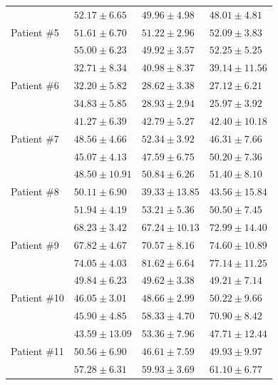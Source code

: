 \documentclass[journal,twoside,web]{ieeecolor}
\begin{document}
\begin{table}[h!]
\begin{tabular}{m{} m{} m{} m{}}
		\hline
		\multirow[t]{3}{*}{Patient \#5}   
		& $52.17 \pm 6.65$ & $49.96 \pm 4.98$ & $48.01 \pm 4.81$ \\ %
        & $51.61 \pm 6.70$ & $51.22 \pm 2.96$ & $52.09 \pm 3.83$ \\
        & $55.00 \pm 6.23$ & $49.92 \pm 3.57$ & $52.25 \pm 5.25$ \\
		\hline
		\multirow[t]{3}{*}{Patient \#6}   
		& $32.71 \pm 8.34$ & $40.98 \pm 8.37$ & $39.14 \pm 11.56$ \\ %
        & $32.20 \pm 5.82$ & $28.62 \pm 3.38$ & $27.12 \pm 6.21$ \\
        & $34.83 \pm 5.85$ & $28.93 \pm 2.94$ & $25.97 \pm 3.92$ \\
		\hline
		\multirow[t]{3}{*}{Patient \#7}   
		& $41.27 \pm 6.39$ & $42.79 \pm 5.27$ & $42.40 \pm 10.18$ \\ %
        & $48.56 \pm 4.66$ & $52.34 \pm 3.92$ & $46.31 \pm 7.66$ \\
        & $45.07 \pm 4.13$ & $47.59 \pm 6.75$ & $50.20 \pm 7.36$ \\
		\hline
		\multirow[t]{3}{*}{Patient \#8}   
		& $48.50 \pm 10.91$ & $50.84 \pm 6.26$ & $51.40 \pm 8.10$ \\ %
        & $50.11 \pm  6.90$ & $39.33 \pm 13.85$ & $43.56 \pm 15.84$ \\
        & $51.94 \pm  4.19$ & $53.21 \pm 5.36$ & $50.50 \pm 7.45$ \\
		\hline
		\multirow[t]{3}{*}{Patient \#9}   
		& $68.23 \pm 3.42$ & $67.24 \pm 10.13$ & $72.99 \pm 14.40$ \\ %
        & $67.82 \pm 4.67$ & $70.57 \pm 8.16$ & $74.60 \pm 10.89$ \\
        & $74.05 \pm 4.03$ & $81.62 \pm 6.64$ & $77.14 \pm 11.25$ \\
        \hline
        \multirow[t]{3}{*}{Patient \#10}
        & $49.84 \pm 6.23$ & $49.62 \pm 3.38$ & $49.21 \pm 7.14$ \\ %
        & $46.05 \pm 3.01$ & $48.66 \pm 2.99$ & $50.22 \pm 9.66$ \\
        & $45.90 \pm 4.85$ & $58.33 \pm 4.70$ & $70.90 \pm 8.42$ \\
        \hline
        \multirow[t]{3}{*}{Patient \#11}
        & $43.59 \pm 13.09$ & $53.36 \pm 7.96$ & $47.71 \pm 12.44$ \\ %
        & $50.56 \pm  6.90$ & $46.61 \pm 7.59$ & $49.93 \pm  9.97$ \\
        & $57.28 \pm  6.31$ & $59.93 \pm 3.69$ & $61.10 \pm  6.77$ \\

\end{tabular}
\end{table}
\end{document}
